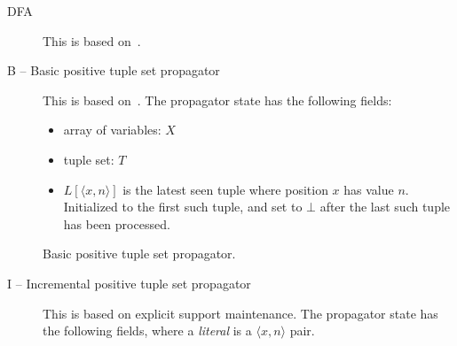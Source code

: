 \documentclass[a4paper,11pt]{article}
\newcommand{\Extensional}{\Constraint{Extensional}~}
\newcommand{\FOREACH}[1]{\FORALL{{#1} \textbf{do}}}
\newcommand{\ENDFOREACH}{\ENDFOR}
\def\PROCEDURE{\item[\textbf{PROCEDURE}]}
\def\bool{\mathit{bool}}
\def\Extensional{\textsc{Extensional}}
\numberwithin{equation}{section}
\begin{document}
\begin{description}
  \item[DFA] This is based on~\cite{Pesant:seqs}.
  \item[B -- Basic positive tuple set propagator]
    This is based on~\cite{DBLP:journals/ai/BessiereRYZ05}.
     The propagator state has the following fields:

     \begin{itemize}
     \item array of variables: $X$
     \item tuple set: $T$
     \item $L[\langle x,n \rangle]$ is the latest seen tuple where position
       $x$ has value $n$.  Initialized to the first such tuple, and set to
       $\bot$ after the last such tuple has been processed.
     \end{itemize}

     \begin{algorithm}
       \caption{Basic positive tuple set propagator.}
     \end{algorithm}
\clearpage

   \item[I -- Incremental positive tuple set propagator]
     This is based on explicit support maintenance.  The propagator state
has the following fields, where a \emph{literal} is a $\langle x,n
\rangle$ pair.


\end{description}
\end{document}
